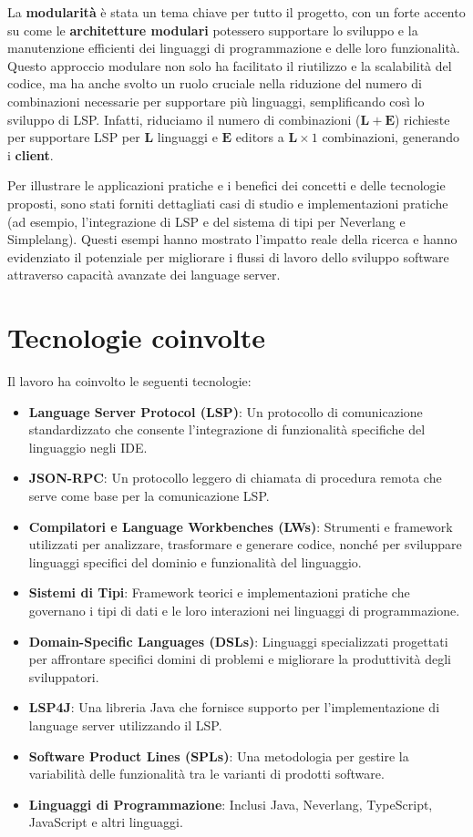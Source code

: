 \documentclass{adapt-lab}
\begin{document}
La \textbf{modularità} è stata un tema chiave per tutto il progetto, con un forte accento su come le \textbf{architetture modulari} potessero supportare lo sviluppo e la manutenzione efficienti dei linguaggi di programmazione e delle loro funzionalità. Questo approccio modulare non solo ha facilitato il riutilizzo e la scalabilità del codice, ma ha anche svolto un ruolo cruciale nella riduzione del numero di combinazioni necessarie per supportare più linguaggi, semplificando così lo sviluppo di LSP. Infatti, riduciamo il numero di combinazioni ($\mathbf{L} + \mathbf{E}$) richieste per supportare LSP per $\mathbf{L}$ linguaggi e $\mathbf{E}$ editors a $\mathbf{L} \times 1$ combinazioni, generando i \textbf{client}.

Per illustrare le applicazioni pratiche e i benefici dei concetti e delle tecnologie proposti, sono stati forniti dettagliati casi di studio e implementazioni pratiche (ad esempio, l'integrazione di LSP e del sistema di tipi per Neverlang e Simplelang). Questi esempi hanno mostrato l'impatto reale della ricerca e hanno evidenziato il potenziale per migliorare i flussi di lavoro dello sviluppo software attraverso capacità avanzate dei language server.

\section{Tecnologie coinvolte}

Il lavoro ha coinvolto le seguenti tecnologie:
\begin{itemize}
\item \textbf{Language Server Protocol (LSP)}: Un protocollo di comunicazione standardizzato che consente l'integrazione di funzionalità specifiche del linguaggio negli IDE.
\item \textbf{JSON-RPC}: Un protocollo leggero di chiamata di procedura remota che serve come base per la comunicazione LSP.
\item \textbf{Compilatori e Language Workbenches (LWs)}: Strumenti e framework utilizzati per analizzare, trasformare e generare codice, nonché per sviluppare linguaggi specifici del dominio e funzionalità del linguaggio.
\item \textbf{Sistemi di Tipi}: Framework teorici e implementazioni pratiche che governano i tipi di dati e le loro interazioni nei linguaggi di programmazione.
\item \textbf{Domain-Specific Languages (DSLs)}: Linguaggi specializzati progettati per affrontare specifici domini di problemi e migliorare la produttività degli sviluppatori.
\item \textbf{LSP4J}: Una libreria Java che fornisce supporto per l'implementazione di language server utilizzando il LSP.
\item \textbf{Software Product Lines (SPLs)}: Una metodologia per gestire la variabilità delle funzionalità tra le varianti di prodotti software.
\item \textbf{Linguaggi di Programmazione}: Inclusi Java, Neverlang, TypeScript, JavaScript e altri linguaggi.
\end{itemize}
\end{document}
